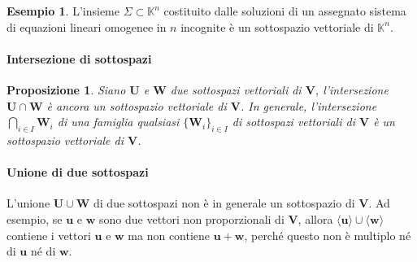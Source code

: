 \documentclass{article}
\theoremstyle{plain}
\newtheorem{prop}[thm]{Proposizione}
\theoremstyle{definition}
\newtheorem{exmp}{Esempio}[section]
\theoremstyle{remark}
\begin{document}
\vspace{10pt}

\begin{exmp}
    L'insieme \(\Sigma \subset \mathbb{K}^n\) costituito dalle soluzioni di un assegnato sistema di equazioni lineari omogenee in \(n\) incognite è un sottospazio vettoriale di \(\mathbb{K}^n\).
\end{exmp}

\vspace{10pt}

\paragraph{Intersezione di sottospazi}
\begin{bxthm}
\begin{prop}\label{prop:sei}
    Siano \(\mathbf{U}\) e \(\mathbf{W}\) due sottospazi vettoriali di \(\mathbf{V}\), l'intersezione \(\mathbf{U} \cap \mathbf{W}\) è ancora un sottospazio vettoriale di \(\mathbf{V}\).
    In generale, l'intersezione \(\bigcap\limits_{i\in I}\mathbf{W}_i\) di una famiglia qualsiasi \(\{\mathbf{W}_i\}_{i\in I}\) di sottospazi vettoriali di \(\mathbf{V}\) è un sottospazio vettoriale di \(\mathbf{V}\).
\end{prop}
\end{bxthm}

\vspace{10pt}

\paragraph{Unione di due sottospazi}
L'unione \(\mathbf{U} \cup \mathbf{W}\) di due sottospazi non è in generale un sottospazio di \(\mathbf{V}\). 
Ad esempio, se \(\mathbf{u}\) e \(\mathbf{w}\) sono due vettori non proporzionali di \(\mathbf{V}\), allora \(\langle \mathbf{u}\rangle \cup \langle \mathbf{w} \rangle\) contiene i vettori $\mathbf{u}$ e $\mathbf{w}$ ma non contiene \(\mathbf{u} + \mathbf{w}\), 
perché questo non è multiplo né di \(\mathbf{u}\) né di \(\mathbf{w}\).\\

\vspace{10pt}
\end{document}
